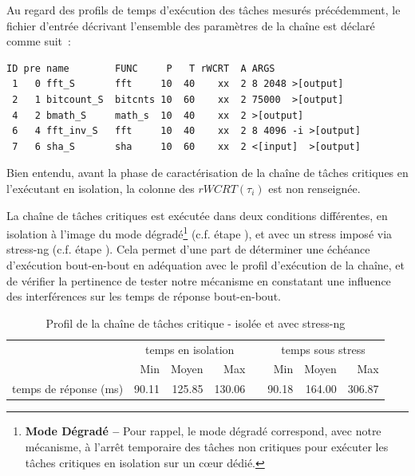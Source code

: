 \documentclass[french, a4paper, 11pt, twoside, pdftex]{StyleThese}
\begin{document}
Au regard des profils de temps d'exécution des tâches mesurés précédemment, le fichier d'entrée décrivant l'ensemble des paramètres de la chaîne est déclaré comme suit~: 
\begin{lstlisting}[caption={Chaine de tâche sélectionnée}, numbers=none, label={code:taskChain.in}]
ID pre name        FUNC     P   T rWCRT  A ARGS
 1   0 fft_S       fft     10  40    xx  2 8 2048 >[output]
 2   1 bitcount_S  bitcnts 10  60    xx  2 75000  >[output]
 4   2 bmath_S     math_s  10  40    xx  2 >[output]
 6   4 fft_inv_S   fft     10  40    xx  2 8 4096 -i >[output]
 7   6 sha_S       sha     10  60    xx  2 <[input]  >[output]
\end{lstlisting}

Bien entendu, avant la phase  de caractérisation de la chaîne de tâches critiques en l'exécutant en isolation, la colonne des $rWCRT(\tau_i)$ est non renseignée.

La chaîne de tâches critiques est exécutée dans deux conditions différentes, en isolation à l'image du mode dégradé\footnote{\textbf{Mode Dégradé --} Pour rappel, le mode dégradé correspond, avec notre mécanisme, à l'arrêt temporaire des tâches non critiques pour exécuter les tâches critiques en isolation sur un cœur dédié.} (c.f. étape ), et avec un stress imposé via stress-ng (c.f. étape ). Cela permet d'une part de déterminer une échéance d'exécution bout-en-bout en adéquation avec le profil d'exécution de la chaîne, et de vérifier la pertinence de tester notre mécanisme en constatant une influence des interférences sur les temps de réponse bout-en-bout.
\smallbreak
\begin{table}[ht]
	\centering
	\caption{Profil de la chaîne de tâches critique - isolée et avec stress-ng}
	\label{tab:TaskChain_IsolStress}
	\begin{tabular}{@{}lrrrcrrr@{}}  %
		\toprule
		& \multicolumn{3}{c}{temps en isolation} &\phantom&\multicolumn{3}{c}{temps sous stress} \\
		\cmidrule{2-4} \cmidrule{6-8} 
		&   Min  & Moyen &  Max   &&  Min  & Moyen & Max 		\\
		\midrule
		temps de réponse (ms) &  90.11 & 125.85 & 130.06 && 90.18 & 164.00 & 306.87  	\\
		\bottomrule
	\end{tabular}
\end{table} 
\end{document}
